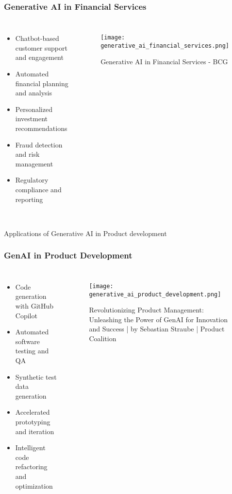 \begin{frame}[fragile]\frametitle{Generative AI in Financial Services}
\begin{columns}
\begin{itemize}
    \item Chatbot-based customer support and engagement
    \item Automated financial planning and analysis
    \item Personalized investment recommendations
    \item Fraud detection and risk management
    \item Regulatory compliance and reporting
\end{itemize}
\begin{figure}
    \texttt{[image: generative\_ai\_financial\_services.png]}
    \caption{Generative AI in Financial Services - BCG}
\end{figure}
\end{columns}
\end{frame}

\begin{frame}[fragile]\frametitle{}
\begin{center}
{\Large Applications of Generative AI in Product development}
\end{center}
\end{frame}

\begin{frame}[fragile]\frametitle{GenAI in Product Development}
\begin{columns}
\begin{itemize}
    \item Code generation with GitHub Copilot
    \item Automated software testing and QA
    \item Synthetic test data generation
    \item Accelerated prototyping and iteration
    \item Intelligent code refactoring and optimization
\end{itemize}
\begin{figure}
    \texttt{[image: generative\_ai\_product\_development.png]}
    \caption{Revolutionizing Product Management: Unleashing the Power of GenAI for Innovation and Success | by Sebastian Straube | Product Coalition}
\end{figure}
\end{columns}
\end{frame}

